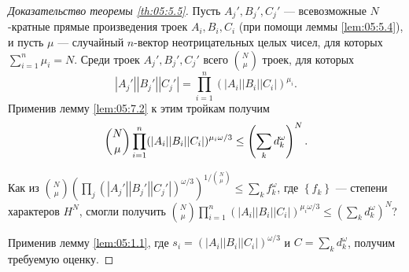 \begin{proof}[Доказательство теоремы \ref{th:05:5.5}]
  Пусть $A_j', B_j', C_j'$ --- всевозможные $N$-кратные прямые произведения троек $A_i, B_i, C_i$ (при помощи леммы \ref{lem:05:5.4}), и пусть $\mu$ --- случайный $n$-вектор неотрицательных целых чисел, для которых $\sum_{i=1}^{n} \mu_i = N$. Среди троек $A_j', B_j', C_j'$ всего $\binom{N}{\mu}$ троек, для которых
  \[
  	|A_j'| |B_j'| |C_j'| = \prod_{i=1}^n (|A_i| |B_i| |C_i|)^{\mu_i}.
  \]
  Применив лемму \ref{lem:05:7.2} к этим тройкам получим
  \[
  	\dbinom{N}{\mu} \prod_{i=1}^n (|A_i| |B_i| |C_i|)^{\mu_i \omega/ 3} \leq \left( \sum_k d_k^\omega \right)^N.
  \]
  \begin{question}
    Как из $\binom{N}{\mu} \left( \prod_j (|A_j'| |B_j'| |C_j'|)^{\omega/ 3} \right)^{1/ \binom{N}{\mu}} \leq \sum_k f_k^\omega $, где $\left\{ f_k \right\}$ --- степени характеров $H^N$, смогли получить $\binom{N}{\mu} \prod_{i=1}^n (|A_i| |B_i| |C_i|)^{\mu_i \omega/ 3} \leq \left( \sum_k d_k^\omega \right)^N$?
  \end{question}
  Применив лемму \ref{lem:05:1.1}, где $s_i = (|A_i| |B_i| |C_i|)^{\omega/ 3}$ и $C = \sum_k d_k^\omega$, получим требуемую оценку.
\end{proof}
